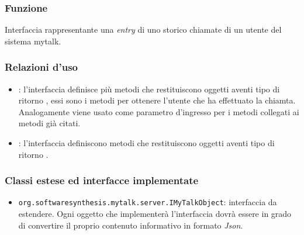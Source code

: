 
\subsubsection*{Funzione}
Interfaccia rappresentante una \textit{entry} di uno storico chiamate di un utente del sistema mytalk.

\subsubsection*{Relazioni d'uso}
\begin{itemize}
	\item {}: l'interfaccia  definisce più metodi che restituiscono oggetti aventi tipo di ritorno , essi sono i metodi  per ottenere l'utente che ha effettuato la chiamta. Analogamente  viene usato come parametro d'ingresso per i metodi  collegati ai metodi già citati.
	\item {}: l'interfaccia  definiscono metodi che restituiscono oggetti aventi tipo di ritorno .
\end{itemize}

\subsubsection*{Classi estese ed interfacce implementate}
\begin{itemize}
	\item \texttt{org.softwaresynthesis.mytalk.server.IMyTalkObject}: interfaccia da estendere. Ogni oggetto che implementerà l'interfaccia  dovrà essere in grado di convertire il proprio contenuto informativo in formato \textit{Json}.
\end{itemize}

